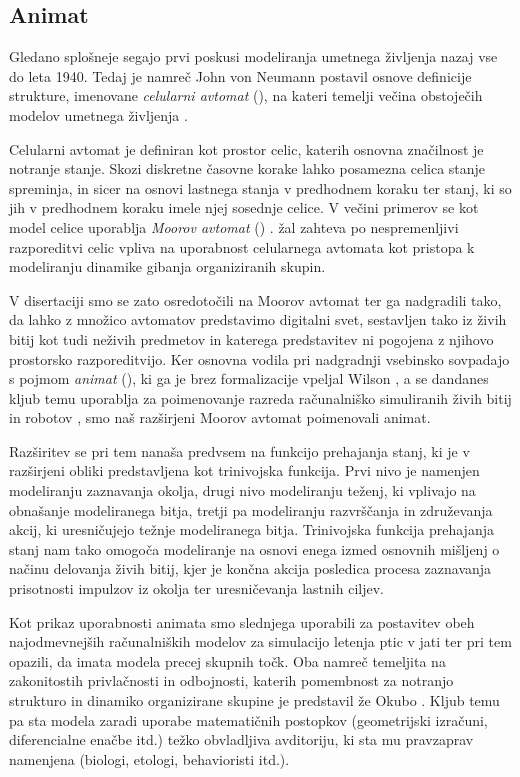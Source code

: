 \begin{razsirjeniPovzetek}
\section{Animat}
Gledano splošneje segajo prvi poskusi modeliranja umetnega življenja nazaj vse do leta 1940. Tedaj je namreč John von Neumann postavil osnove definicije strukture, imenovane \emph{celularni avtomat} (), na kateri temelji večina obstoječih modelov umetnega življenja \cite{adami:1998,bonabeau:1999,emmenche:1994,gardner:1970,langton:1984,rucker:1993}. 

Celularni avtomat je definiran kot prostor celic, katerih osnovna značilnost je notranje stanje. Skozi diskretne časovne korake lahko posamezna celica stanje spreminja, in sicer na osnovi lastnega stanja v predhodnem koraku ter stanj, ki so jih v predhodnem koraku imele njej sosednje celice. V večini primerov se kot model celice uporablja \emph{Moorov avtomat} () \cite{mraz:2000}. žal zahteva po nespremenljivi razporeditvi celic vpliva na uporabnost celularnega avtomata kot pristopa k modeliranju dinamike gibanja organiziranih skupin. 

V disertaciji smo se zato osredotočili na Moorov avtomat ter ga nadgradili tako, da lahko z množico avtomatov predstavimo digitalni svet, sestavljen tako iz živih bitij kot tudi neživih predmetov in katerega predstavitev ni pogojena z njihovo prostorsko razporeditvijo. Ker osnovna vodila pri nadgradnji vsebinsko sovpadajo s pojmom \emph{animat} (), ki ga je brez formalizacije vpeljal Wilson \cite{wilson:1985}, a se dandanes kljub temu uporablja za poimenovanje razreda računalniško simuliranih živih bitij in robotov \cite{cliff:1993,watts:1998}, smo naš razširjeni Moorov avtomat poimenovali animat. 

Razširitev se pri tem nanaša predvsem na funkcijo prehajanja stanj, ki je v razširjeni obliki predstavljena kot trinivojska funkcija. Prvi nivo je namenjen modeliranju zaznavanja okolja, drugi nivo modeliranju teženj, ki vplivajo na obnašanje modeliranega bitja, tretji pa modeliranju razvrščanja in združevanja akcij, ki uresničujejo težnje modeliranega bitja. Trinivojska funkcija prehajanja stanj nam tako omogoča modeliranje na osnovi enega izmed osnovnih mišljenj o načinu delovanja živih bitij, kjer je končna akcija posledica procesa zaznavanja prisotnosti impulzov iz okolja ter uresničevanja lastnih ciljev.

Kot prikaz uporabnosti animata smo slednjega uporabili za postavitev obeh najodmevnejših računalniških modelov za simulacijo letenja ptic v jati ter pri tem opazili, da imata modela precej skupnih točk. Oba namreč temeljita na zakonitostih privlačnosti in odbojnosti, katerih pomembnost za notranjo strukturo in dinamiko organizirane skupine je predstavil že Okubo \cite{okubo:1980}. Kljub temu pa sta modela zaradi uporabe matematičnih postopkov (geometrijski izračuni, diferencialne enačbe itd.) težko obvladljiva avditoriju, ki sta mu pravzaprav namenjena (biologi, etologi, behavioristi itd.).


\end{razsirjeniPovzetek}
